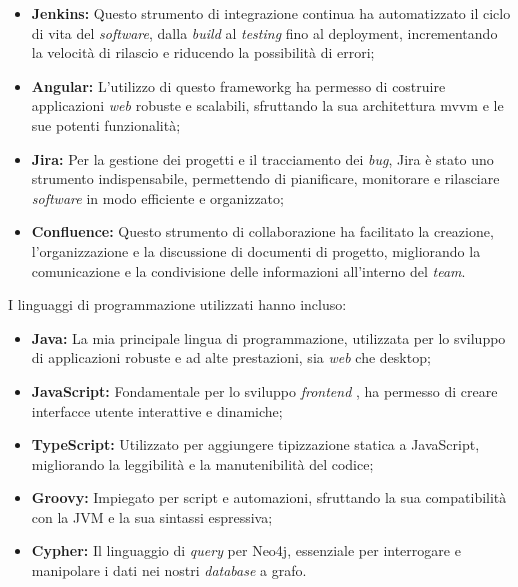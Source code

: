 \begin{itemize}
\item \textbf{Jenkins:} Questo strumento di integrazione continua ha automatizzato il ciclo di vita del \textit{software}, dalla \textit{build}  al \textit{testing}  fino al deployment, incrementando la velocità di rilascio e riducendo la possibilità di errori;

\item \textbf{Angular:} L'utilizzo di questo \gls{frameworkg} ha permesso di costruire applicazioni \textit{web} robuste e scalabili, sfruttando la sua architettura \gls{mvvm} e le sue potenti funzionalità;

\item \textbf{Jira:} Per la gestione dei progetti e il tracciamento dei \textit{bug}, Jira è stato uno strumento indispensabile, permettendo di pianificare, monitorare e rilasciare \textit{software} in modo efficiente e organizzato;

\item \textbf{Confluence:} Questo strumento di collaborazione ha facilitato la creazione, l'organizzazione e la discussione di documenti di progetto, migliorando la comunicazione e la condivisione delle informazioni all'interno del \textit{team}.
\end{itemize}


I linguaggi di programmazione utilizzati hanno incluso:

\begin{itemize}
\item \textbf{Java:} La mia principale lingua di programmazione, utilizzata per lo sviluppo di applicazioni robuste e ad alte prestazioni, sia \textit{web} che desktop;

\item \textbf{JavaScript:} Fondamentale per lo sviluppo \textit{frontend}  , ha permesso di creare interfacce utente interattive e dinamiche;

\item \textbf{TypeScript:} Utilizzato per aggiungere tipizzazione statica a JavaScript, migliorando la leggibilità e la manutenibilità del codice;

\item \textbf{Groovy:} Impiegato per script e automazioni, sfruttando la sua compatibilità con la \gls{JVM} e la sua sintassi espressiva;

\item \textbf{Cypher:} Il linguaggio di \textit{query} per Neo4j, essenziale per interrogare e manipolare i dati nei nostri \textit{database} a grafo.
\end{itemize}

